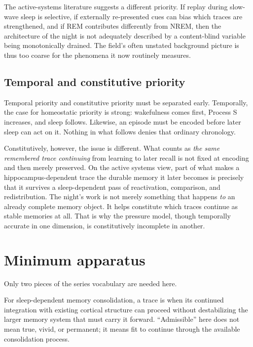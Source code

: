 \documentclass[11pt]{article}
\begin{document}
The active-systems literature suggests a different priority. If replay during slow-wave sleep is selective, if externally re-presented cues can bias which traces are strengthened, and if REM contributes differently from NREM, then the architecture of the night is not adequately described by a content-blind variable being monotonically drained. The field's often unstated background picture is thus too coarse for the phenomena it now routinely measures.

\subsection*{Temporal and constitutive priority}
Temporal priority and constitutive priority must be separated early. Temporally, the case for homeostatic priority is strong: wakefulness comes first, Process S increases, and sleep follows. Likewise, an episode must be encoded before later sleep can act on it. Nothing in what follows denies that ordinary chronology.

Constitutively, however, the issue is different. What counts as \emph{the same remembered trace continuing} from learning to later recall is not fixed at encoding and then merely preserved. On the active systems view, part of what makes a hippocampus-dependent trace the durable memory it later becomes is precisely that it survives a sleep-dependent pass of reactivation, comparison, and redistribution. The night's work is not merely something that happens \emph{to} an already complete memory object. It helps constitute which traces continue as stable memories at all. That is why the pressure model, though temporally accurate in one dimension, is constitutively incomplete in another.

\section{Minimum apparatus}
Only two pieces of the series vocabulary are needed here.

\begin{definition}
For sleep-dependent memory consolidation, a trace is \admissible when its continued integration with existing cortical structure can proceed without destabilizing the larger memory system that must carry it forward. ``Admissible'' here does not mean true, vivid, or permanent; it means fit to continue through the available consolidation process.
\end{definition}
\end{document}
